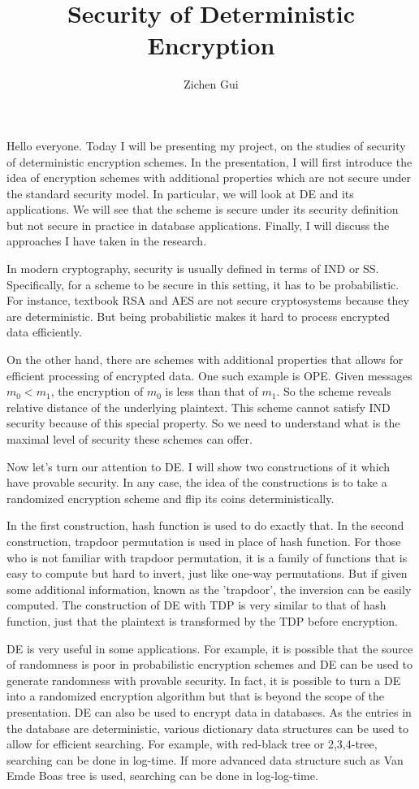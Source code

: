 \documentclass[10pt]{article}
\title{Security of Deterministic Encryption}
\author{Zichen Gui}
\begin{document}
Hello everyone. Today I will be presenting my project, on the studies of security of deterministic encryption schemes. In the presentation, I will first introduce the idea of encryption schemes with additional properties which are not secure under the standard security model. In particular, we will look at DE and its applications. We will see that the scheme is secure under its security definition but not secure in practice in database applications. Finally, I will discuss the approaches I have taken in the research.

In modern cryptography, security is usually defined in terms of IND or SS. Specifically, for a scheme to be secure in this setting, it has to be probabilistic. For instance, textbook RSA and AES are not secure cryptosystems because they are deterministic. But being probabilistic makes it hard to process encrypted data efficiently.

On the other hand, there are schemes with additional properties that allows for efficient processing of encrypted data. One such example is OPE. Given messages $m_0 < m_1$, the encryption of $m_0$ is less than that of $m_1$. So the scheme reveals relative distance of the underlying plaintext. This scheme cannot satisfy IND security because of this special property. So we need to understand what is the maximal level of security these schemes can offer.
	
Now let's turn our attention to DE. I will show two constructions of it which have provable security. In any case, the idea of the constructions is to take a randomized encryption scheme and flip its coins deterministically.

In the first construction, hash function is used to do exactly that. In the second construction, trapdoor permutation is used in place of hash function. For those who is not familiar with trapdoor permutation, it is a family of functions that is easy to compute but hard to invert, just like one-way permutations. But if given some additional information, known as the 'trapdoor', the inversion can be easily computed. The construction of DE with TDP is very similar to that of hash function, just that the plaintext is transformed by the TDP before encryption.

DE is very useful in some applications. For example, it is possible that the source of randomness is poor in probabilistic encryption schemes and DE can be used to generate randomness with provable security. In fact, it is possible to turn a DE into a randomized encryption algorithm but that is beyond the scope of the presentation. DE can also be used to encrypt data in databases. As the entries in the database are deterministic, various dictionary data structures can be used to allow for efficient searching. For example, with red-black tree or 2,3,4-tree, searching can be done in log-time. If more advanced data structure such as Van Emde Boas tree is used, searching can be done in log-log-time.
\end{document}
